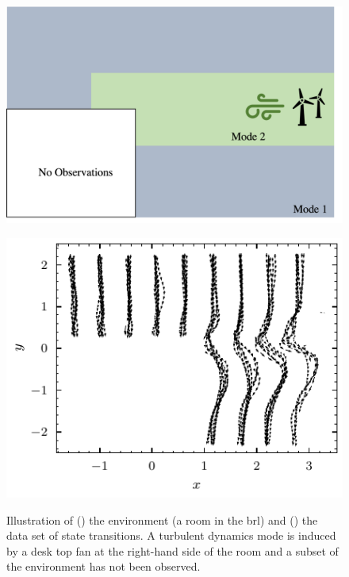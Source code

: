 \documentclass{mimosis-class/mimosis}
\numberwithin{equation}{chapter}
\begin{document}
{\begin{figure}[h]
\centering
\begin{minipage}[r]{0.55\columnwidth}
\centering
\includegraphics[width=\textwidth]{./images/brl-quadcopter-domain-figure.png}
\label{fig-quadcopter-environment}
\end{minipage}
\begin{minipage}[r]{0.44\columnwidth}
\includegraphics[width=\textwidth]{./images/model/quadcopter/subset-10/dataset_quiver.pdf}
\label{fig-quiver}
\end{minipage}
\caption[Diagram of the real-world quadcotper environment and the state transition data set]{Illustration of () the environment (a room in the \acrfull{brl}) and () the data set of state transitions. A turbulent dynamics mode is induced by a desk top fan at the right-hand side of the room and a subset of the environment has not been observed.}
\end{figure}


}
\end{document}
